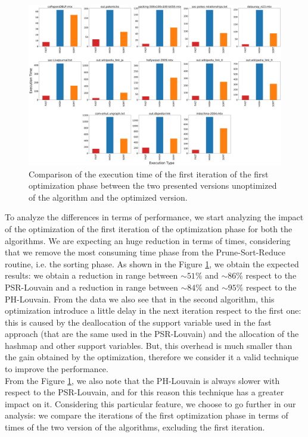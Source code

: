 \begin{figure}[t!]
	\centering
	\includegraphics[width=1\linewidth]{0-resources/first-hash-sort}
	\caption{Comparison of the execution time of the first iteration of the first optimization phase between the two presented versions unoptimized of the algorithm and the optimized version.}
	\label{fig:first-hash-sort}
\end{figure}
To analyze the differences in terms of performance, we start analyzing the impact of the optimization of the first iteration of the optimization phase for both the algorithms. We are expecting an huge reduction in terms of times, considering that we remove the most consuming time phase from the Prune-Sort-Reduce routine, i.e. the sorting phase. As shown in the Figure \ref{fig:first-hash-sort}, we obtain the expected results: we obtain a reduction in range between $\sim 51\%$ and $\sim 86\%$ respect to the PSR-Louvain and a reduction in range between $\sim 84\%$ and $\sim 95\%$ respect to the PH-Louvain. From the data we also see that in the second algorithm, this optimization introduce a little delay in the next iteration respect to the first one: this is caused by the deallocation of the support variable used in the fast approach (that are the same used in the PSR-Louvain) and the allocation of the hashmap and other support variables. But, this overhead is much smaller than the gain obtained by the optimization, therefore we consider it a valid technique to improve the performance.\\
From the Figure \ref{fig:first-hash-sort}, we also note that the PH-Louvain is always slower with respect to the PSR-Louvain, and for this reason this technique has a greater impact on it. Considering this particular feature, we choose to go further in our analysis: we compare the iterations of the first optimization phase in terms of times of the two version of the algorithms, excluding the first iteration.
